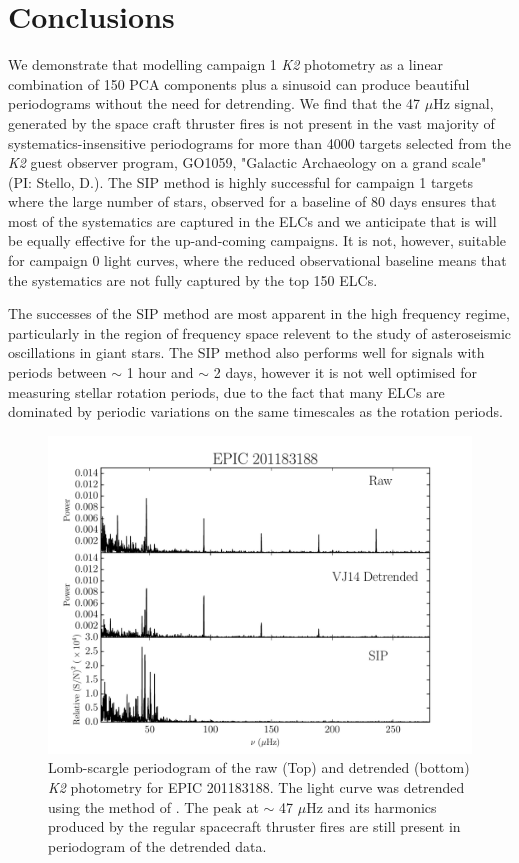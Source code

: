 \documentclass[useAMS, usenatbib]{aastex}
\begin{document}
\section{Conclusions}
We demonstrate that modelling campaign 1 {\it K2} photometry as a linear
combination of 150 PCA components plus a sinusoid can produce beautiful
periodograms without the need for detrending.
We find that the 47 $\mu$Hz signal, generated by the space craft thruster
fires is not present in the vast majority of systematics-insensitive
periodograms for more than 4000 targets
selected from the {\it K2} guest observer program, GO1059, "Galactic
Archaeology on a grand scale" (PI: Stello, D.).
The SIP method is highly successful for campaign 1 targets where the large
number of stars, observed for a baseline of 80 days ensures that most of the
systematics are captured in the ELCs and we anticipate that is will
be equally effective for the up-and-coming campaigns.
It is not, however, suitable for campaign 0 light curves, where the reduced
observational baseline means that the systematics are not fully captured by the
top 150 ELCs.

The successes of the SIP method are most apparent in the high frequency regime,
particularly in the region of frequency space relevent to the study of
asteroseismic oscillations in giant stars.
The SIP method also performs well for signals with periods between $\sim$
1 hour and $\sim$ 2 days, however it is not well optimised for measuring
stellar rotation periods, due to the fact that many ELCs are dominated by
periodic variations on the same timescales as the rotation periods.

\begin{figure}
\begin{center}
\includegraphics[width=6in, clip=true]{rawvbg_201183188.pdf}
\caption{Lomb-scargle periodogram of the raw (Top) and detrended
	 (bottom) {\it K2} photometry for EPIC 201183188. The light curve was
 	 detrended using the method of \citet{Vanderburg2014}. The peak at
	 $\sim$ 47 $\mu$Hz and its harmonics produced by the regular spacecraft
	 thruster fires are still present in periodogram of the detrended
	 data.}
\label{fig:raw}
\end{center}
\end{figure}
\end{document}
